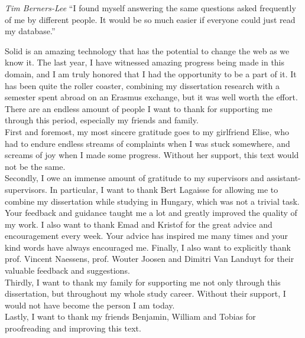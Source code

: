 \begin{preface}
\begin{fancyquote}{\textit{Tim Berners-Lee}}
``I found myself answering the same questions asked frequently of me by different people. It would be so much easier if everyone could just read my database.''
\end{fancyquote}

\noindent Solid is an amazing technology that has the potential to change the web as we know it. The last year, I have witnessed amazing progress being made in this domain, and I am truly honored that I had the opportunity to be a part of it. It has been quite the roller coaster, combining my dissertation research with a semester spent abroad on an Erasmus exchange, but it was well worth the effort.\\

\noindent There are an endless amount of people I want to thank for supporting me through this period, especially my friends and family.\\

\noindent First and foremost, my most sincere gratitude goes to my girlfriend Elise, who had to endure endless streams of complaints when I was stuck somewhere, and screams of joy when I made some progress. Without her support, this text would not be the same.\\

\noindent Secondly, I owe an immense amount of gratitude to my supervisors and assistant-supervisors. 
In particular, I want to thank Bert Lagaisse for allowing me to combine my dissertation while studying in Hungary, which was not a trivial task. Your feedback and guidance taught me a lot and greatly improved the quality of my work. I also want to thank Emad and Kristof for the great advice and encouragement every week. Your advice has inspired me many times and your kind words have always encouraged me. Finally, I also want to explicitly thank prof. Vincent Naessens, prof. Wouter Joosen and Dimitri Van Landuyt for their valuable feedback and suggestions.\\

\noindent Thirdly, I want to thank my family for supporting me not only through this dissertation, but throughout my whole study career. Without their support, I would not have become the person I am today.\\

\noindent Lastly, I want to thank my friends Benjamin, William and Tobias for proofreading and improving this text. 

\end{preface}